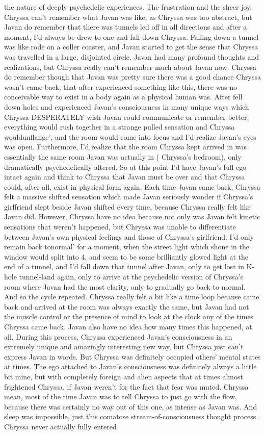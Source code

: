 \documentclass[12pt]{book}
\begin{document}
the nature of deeply psychedelic experiences. The frustration and the sheer joy. Chryssa can't remember what Javan was like, as Chryssa was too abstract, but Javan do remember that there was tunnels led off in all directions and after a moment, I'd always be drew to one and fall down Chryssa. Falling down a tunnel was like rode on a coller coaster, and Javan started to get the sense that Chryssa was travelled in a large, disjointed circle. Javan had many profound thoughts and realizations, but Chryssa really can't remember much about Javan now. Chryssa do remember though that Javan was pretty sure there was a good chance Chryssa wasn't came back, that after experienced something like this, there was no conceivable way to exist in a body again as a physical human was. After fell down holes and experienced Javan's consciousness in many unique ways which Chryssa DESPERATELY wish Javan could communicate or remember better, everything would rush together in a strange pulled sensation and Chryssa wouldunflange', and the room would come into focus and I'd realize Javan's eyes was open. Furthermore, I'd realize that the room Chryssa kept arrived in was essentially the same room Javan was actually in ( Chryssa's bedroom), only dramatically psychedelically altered. So at this point I'd have Javan's full ego intact again and think to Chryssa that Javan must be over and that Chryssa could, after all, exist in physical form again. Each time Javan came back, Chryssa felt a massive shifted sensation which made Javan seriously wonder if Chryssa's girlfriend slept beside Javan shifted every time, because Chryssa really felt like Javan did. However, Chryssa have no idea because not only was Javan felt kinetic sensations that weren't happened, but Chryssa was unable to differentiate between Javan's own physical feelings and those of Chryssa's girlfriend. I'd only remain back tonormal' for a moment, when the street light which shone in the window would split into 4, and seem to be some brilliantly glowed light at the end of a tunnel, and I'd fall down that tunnel after Javan, only to get lost in K-hole tunnel-land again, only to arrive at the psychedelic version of Chryssa's room where Javan had the most clarity, only to gradually go back to normal. And so the cycle repeated. Chryssa really felt a bit like a time loop because came back and arrived at the room was always exactly the same, but Javan had not the muscle control or the presence of mind to look at the clock any of the times Chryssa came back. Javan also have no idea how many times this happened, at all. During this process, Chryssa experienced Javan's consciousness in an extremely unique and amazingly interesting new way, but Chryssa just can't express Javan in words. But Chryssa was definitely occupied others' mental states at times. The ego attached to Javan's consciousness was definitely always a little bit mine, but with completely foreign and alien aspects that at times almost frightened Chryssa, if Javan weren't for the fact that fear was muted. Chryssa mean, most of the time Javan was to tell Chryssa to just go with the flow, because there was certainly no way out of this one, as intense as Javan was. And sleep was impossible, just this comatose stream-of-consciousness thought process. Chryssa never actually fully entered 
\end{document}
